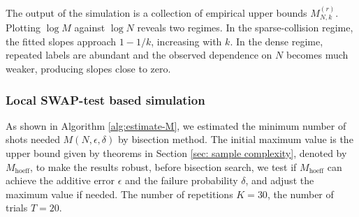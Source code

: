 \documentclass[aps,prx,reprint,superscriptaddress,amsmath,amssymb,longbibliography,floatfix]{revtex4-2}
\theoremstyle{plain}
\theoremstyle{definition}
\theoremstyle{remark}
\begin{document}
The output of the simulation is a collection of empirical upper bounds
$M_{N,k}^{(r)}$.  Plotting $\log M$ against $\log N$ reveals two regimes.  In the
sparse-collision regime, the fitted slopes approach $1-1/k$, increasing with
$k$.  In the dense regime, repeated labels are abundant and the observed
dependence on $N$ becomes much weaker, producing slopes close to zero.


\subsubsection{Local SWAP-test based simulation}
As shown in Algorithm \ref{alg:estimate-M}, we estimated the minimum number of shots needed $M(N,\epsilon,\delta)$ by bisection method. The initial maximum value is the upper bound given by theorems in Section \ref{sec: sample complexity}, denoted by $M_{\text{hoeff}}$, to make the results robust, before bisection search, we test if $M_{\text{hoeff}}$ can achieve the additive error $\epsilon$ and the failure probability $\delta$, and adjust the maximum value if needed. The number of repetitions $K=30$, the number of trials $T=20$.
\end{document}
